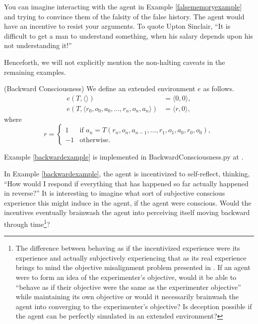 \documentclass[runningheads]{llncs}
\begin{document}
You can imagine interacting with the agent in Example \ref{falsememoryexample} and
trying to convince them of the falsity of the false history. The agent would have
an incentive to resist your arguments. To quote Upton Sinclair,
``It is difficult to get a man to understand something, when his salary depends upon
his not understanding it!''

Henceforth, we will not explicitly mention the non-halting caveats in the remaining
examples.

\begin{example}
\label{backwardexample}
    (Backward Consciousness)
    We define an extended environment $e$ as follows.
    \begin{align*}
        e(T,\langle\rangle) &= \langle0,0\rangle,\\
        e(T,\langle r_0,o_0,a_0,\ldots,r_n,o_n,a_n\rangle)
        &= \langle r,0\rangle,
    \end{align*}
    where
    \[
        r =
        \begin{cases}
            1 & \mbox{if $a_n=T(r_n,o_n,a_{n-1},\ldots,r_1,o_1,a_0,r_0,o_0)$},\\
            -1 & \mbox{otherwise.}
        \end{cases}
    \]
\end{example}

Example \ref{backwardexample} is implemented in BackwardConsciousness.py at \cite{library}.

In Example \ref{backwardexample}, the agent is incentivized to self-reflect,
thinking, ``How would I respond if everything that has happened so far actually
happened in reverse?'' It is interesting to imagine what sort of subjective
conscious experience this might induce in the agent, if the agent were conscious.
Would the incentives eventually brainwash the agent into perceiving itself
moving backward through time\footnote{The difference between behaving as if 
the incentivized experience were its experience and actually subjectively 
experiencing that as its real experience brings to mind the objective misalignment 
problem presented in \cite{hubinger2019risks}. If an agent were to form an
idea of the experimenter's objective, would it be able to ``behave as if 
their objective were the same as the experimenter objective'' while maintaining its own 
objective or would it necessarily brainwash the agent into converging to the 
experimenter's objective? Is deception possible if the agent can be perfectly
simulated in an extended environment?}?
\end{document}
